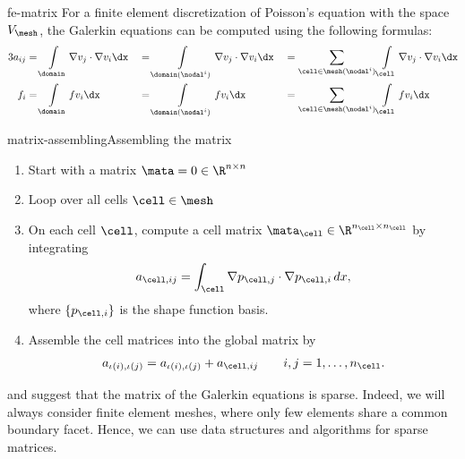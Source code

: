 \begin{Lemma}{fe-matrix}
  For a finite element discretization of Poisson's equation with the
  space $V_\mesh$, the Galerkin equations can be computed using the
  following formulas:
  \begin{alignat*}3
    a_{ij} &= \int\limits_\domain \nabla v_j \cdot \nabla v_i \dx
    &&= \int\limits_{\domain(\nodal^i)} \nabla v_j \cdot \nabla v_i \dx
    &&= \sum_{\cell\in\mesh(\nodal^i)}\int\limits_\cell \nabla v_j \cdot \nabla v_i \dx\\
    f_{i} &= \int\limits_\domain f v_i \dx
    &&= \int\limits_{\domain(\nodal^i)} f v_i \dx
    &&= \sum_{\cell\in\mesh(\nodal^i)}\int\limits_\cell f v_i \dx
  \end{alignat*}
\end{Lemma}

\begin{Algorithm*}{matrix-assembling}{Assembling the matrix}
  \begin{enumerate}
  \item Start with a matrix $\mata = 0 \in \R^{n\times n}$
  \item Loop over all cells $\cell\in\mesh$
  \item On each cell $\cell$, compute a cell matrix
    $\mata_\cell \in \R^{n_\cell\times n_\cell}$ by integrating
    \begin{gather}
      a_{\cell,ij} = \int_\cell \nabla p_{\cell,j}\cdot\nabla p_{\cell,i}\,dx,
    \end{gather}
    where $\{p_{\cell,i}\}$ is the shape function basis.
  \item Assemble the cell matrices into the global matrix by
    \begin{gather}
      a_{\iota(i),\iota(j)} = a_{\iota(i),\iota(j)} + a_{\cell,ij}
      \qquad i,j = 1,\dots,n_\cell.
    \end{gather}
  \end{enumerate}
\end{Algorithm*}

\begin{remark}
   and
   suggest that the matrix of
  the Galerkin equations is sparse. Indeed, we will always consider
  finite element meshes, where only few elements share a common
  boundary facet. Hence, we can use data structures and algorithms for
  sparse matrices.
\end{remark}

